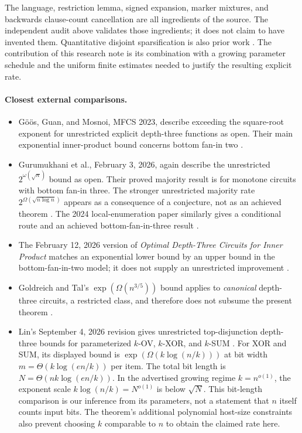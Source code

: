 \documentclass[11pt]{article}
\begin{document}
The language, restriction lemma, signed expansion, marker mixtures, and
backwards clause-count cancellation are all ingredients of the source.
The independent audit above validates those ingredients; it does not claim
to have invented them. Quantitative disjoint sparsification is also prior
work \cite{CIP,DHMTW,Williams}. The contribution of this research note is
its combination with a growing parameter schedule and the uniform finite
estimates needed to justify the resulting explicit rate.

\paragraph{Closest external comparisons.}
\begin{itemize}
\item G\"o\"os, Guan, and Mosnoi, MFCS 2023, describe exceeding the
square-root exponent for unrestricted explicit depth-three functions as
open. Their main exponential inner-product bound concerns bottom fan-in
two \cite[pp.~51:1--51:2]{GGM23}.
\item Gurumukhani et al., February 3, 2026, again describe the unrestricted
$2^{\omega(\sqrt n)}$ bound as open. Their proved majority result is for
monotone circuits with bottom fan-in three. The stronger unrestricted
majority rate $2^{\Omega(\sqrt{n\log n})}$ appears as a consequence of
a conjecture, not as an achieved theorem \cite[Section~1]{GKKPRST}.
The 2024 local-enumeration paper similarly gives a conditional route and
an achieved bottom-fan-in-three result \cite{GPPST24}.
\item The February 12, 2026 version of \emph{Optimal Depth-Three Circuits
for Inner Product} matches an exponential lower bound by an upper bound
in the bottom-fan-in-two model; it does not supply an unrestricted
improvement \cite{GKPRT26IP}.
\item Goldreich and Tal's $\exp(\Omega(n^{3/5}))$ bound applies to
\emph{canonical} depth-three circuits, a restricted class, and therefore
does not subsume the present theorem \cite[Corollary~1.4]{GT15}.
\item Lin's September 4, 2026 revision gives unrestricted top-disjunction
depth-three bounds for parameterized $k$-OV, $k$-XOR, and $k$-SUM
\cite{Lin26}. For XOR and SUM, its displayed bound is
$\exp(\Omega(k\log(n/k)))$ at bit width
$m=\Theta(k\log(en/k))$ per item. The total bit length is
$N=\Theta(nk\log(en/k))$. In the advertised growing regime
$k=n^{o(1)}$, the exponent scale $k\log(n/k)=N^{o(1)}$ is below
$\sqrt N$. This bit-length comparison is our inference from its
parameters, not a statement that $n$ itself counts input bits. The
theorem's additional polynomial host-size constraints also prevent
choosing $k$ comparable to $n$ to obtain the claimed rate here.
\end{itemize}
\end{document}
